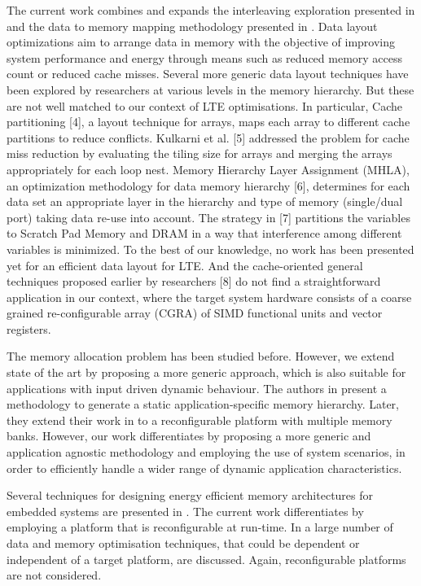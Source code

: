 \documentclass[prodmode,acmtodaes]{acmsmall}
\begin{document}
The current work combines and expands the interleaving exploration presented in \cite{sharma2013data} and the data to memory mapping methodology presented in \cite{filippopoulos2013exploration}. Data layout optimizations aim to arrange data in memory with the objective of improving system performance and energy through means such as reduced memory access count or reduced cache misses. Several more generic data layout techniques have been explored by researchers at various levels in the memory hierarchy. But these are not well matched to our context of LTE optimisations. In particular, Cache partitioning [4], a layout technique for arrays, maps each array to different cache partitions to reduce conflicts. Kulkarni et al. [5] addressed the problem for cache miss reduction by evaluating the tiling size for arrays and merging the arrays appropriately for each loop nest. Memory Hierarchy Layer Assignment (MHLA), an optimization methodology for data memory hierarchy [6], determines for each data set an appropriate layer in the hierarchy and type of memory (single/dual port) taking data re-use into account. The strategy in [7] partitions the variables to Scratch Pad Memory and DRAM in a way that interference among different variables is minimized. To the best of our knowledge, no work has been presented yet for an efficient data layout for LTE. And the cache-oriented general techniques proposed earlier by researchers [8] do not find a straightforward application in our context, where the target system hardware consists of a coarse grained re-configurable array (CGRA) of SIMD functional units and vector registers.

The memory allocation problem has been studied before. 
However, we extend state of the art by proposing a more generic approach, which is also suitable for applications with input driven dynamic behaviour. 
The authors in \cite{Ben00b} present a methodology to generate a static application-specific memory hierarchy. 
Later, they extend their work in \cite{Ben00c} to a reconfigurable platform with multiple memory banks. 
However, our work differentiates by proposing a more generic and application agnostic methodology and employing the use of system scenarios, in order to efficiently handle a wider range of dynamic application characteristics. 

Several techniques for designing energy efficient memory architectures for embedded systems are presented in \cite{Mac02}. 
The current work differentiates by employing a platform that is reconfigurable at run-time. 
In \cite{Pgk01} a large number of data and memory optimisation techniques, that could be dependent or independent of a target platform, are discussed. 
Again, reconfigurable platforms are not considered.
\end{document}
